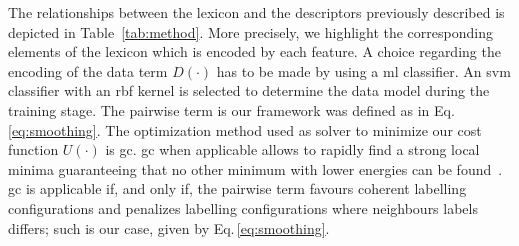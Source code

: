 The relationships between the lexicon and the descriptors previously described is depicted in Table~\ref{tab:method}. More precisely, we highlight the corresponding elements of the lexicon which is encoded by each feature. A choice regarding the encoding of the data term $D(\cdot)$ has to be made by using a \ac{ml} classifier. An \ac{svm} classifier with an \ac{rbf} kernel is selected to determine the data model during the training stage. The pairwise term is our framework was defined as in Eq.\,\eqref{eq:smoothing}. The optimization method used as solver to minimize our cost function $U(\cdot)$ is \ac{gc}. \ac{gc} when applicable allows to rapidly find a strong local minima guaranteeing that no other minimum with lower energies can be found~\cite{delong2012fast}. \ac{gc} is applicable if, and only if, the pairwise term favours coherent labelling configurations and penalizes labelling configurations where neighbours labels differs; such is our case, given by Eq.\,\eqref{eq:smoothing}.  
